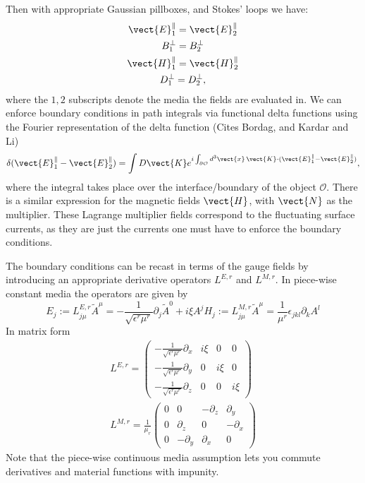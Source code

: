 Then with appropriate Gaussian pillboxes, and Stokes' loops we have:
\begin{gather}
  \vect{E}^\|_1 =\vect{E}^\|_2 \\
  B_1^\perp = B_2^\perp\\
  \vect{H}^\|_1 =\vect{H}^\|_2 \\
  D_1^\perp = D_2^\perp,
\end{gather}
where the $1,2$ subscripts denote the media the fields are evaluated in.  
We can enforce boundary conditions in path integrals via functional delta functions using
the Fourier representation of the delta function 
(Cites Bordag, and Kardar and Li)
\begin{equation}
  \delta(\vect{E}^\|_1-\vect{E}^\|_2) = \int D\vect{K} e^{i\int_{\partial \mathcal{O}} d^3\vect{x}\,
    \vect{K}\cdot(\vect{E}^\|_1-\vect{E}^\|_2)},
\end{equation}
where the integral takes place over the interface/boundary of the object $\mathcal{O}$.
There is a similar expression for the magnetic fields $\vect{H}$, with $\vect{N}$ as the multiplier.  
These Lagrange multiplier fields correspond to the fluctuating surface currents, as they 
are just the currents one must have to enforce the boundary conditions.  

The boundary conditions can be recast in terms of the gauge fields by introducing an appropriate
derivative operators $L^{E,r}$ and $L^{M,r}$.  In piece-wise constant media the operators are given by
\begin{equation}
  E_j:=L^{E,r}_{j\mu}\tilde{A}^\mu = -\frac{1}{\sqrt{\epsilon^r\mu^r}}\partial_j \tilde{A}^0+i\xi A^j
  H_j:=L^{M,r}_{j\mu}\tilde{A}^\mu = \frac{1}{\mu^r}\epsilon_{jkl}\partial_k A^l
\end{equation}
In matrix form
\begin{gather}
  L^{E,r} = \left( \begin{array}{cccc} 
      -\frac{1}{\sqrt{\epsilon^r\mu^r}}\partial_x & i\xi & 0 & 0\\
      -\frac{1}{\sqrt{\epsilon^r\mu^r}}\partial_y & 0 &i\xi & 0\\
      -\frac{1}{\sqrt{\epsilon^r\mu^r}}\partial_z & 0 & 0 & i\xi
    \end{array}
  \right)\\
  L^{M,r} = \frac{1}{\mu_r}\left( \begin{array}{cccc} 
      0 & 0 & -\partial_z & \partial_y\\
      0 & \partial_z & 0 & -\partial_x\\
      0 & -\partial_y & \partial_x & 0
    \end{array}
  \right)
  \end{gather}
Note that the piece-wise continuous media assumption lets you commute derivatives and 
material functions with impunity. 

